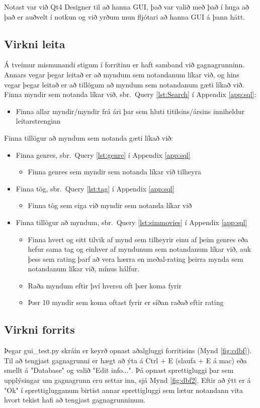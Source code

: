 \documentclass[12pt, git, draft]{rureport}
\begin{document}
Notast var við Qt4 Designer \cite{qt4} til að hanna GUI, það var valið með það í huga að það er auðvelt í notkun og við yrðum mun fljótari að hanna GUI á þann hátt.

\subsection{Virkni leita}
Á tveimur mismunandi stigum í forritinu er haft samband við gagnagrunninn. Annars vegar þegar leitað er að myndum sem notandanum líkar við, og hins vegar þegar leitað er að tillögum að myndum sem notandanum gæti líkað við.
\\
Finna myndir sem notanda líkar við, sbr.~Query \ref{lst:Search} í Appendix \ref{app:sql}:
\begin{itemize}
	\item Finna allar myndir/myndir frá ári þar sem hluti titilsins/ársins inniheldur leitarstrenginn
\end{itemize}
Finna tillögur að myndum sem notanda gæti líkað við:
\begin{itemize}
	\item Finna genres, sbr.~Query \ref{lst:genre} í Appendix \ref{app:sql}
	\begin{itemize}
		\item Finna genres sem myndir sem notanda líkar við tilheyra
	\end{itemize}
	\item Finna tög, sbr.~Query \ref{lst:tag} í Appendix \ref{app:sql}
	\begin{itemize}
		\item Finna tög sem eiga við myndir sem notanda líkar við
	\end{itemize}
	\item Finna tillögur að myndum, sbr.~Query \ref{lst:simmovies} í Appendix \ref{app:sql}
	\begin{itemize}
		\item Finna hvert og eitt tilvik af mynd sem tilheyrir einu af þeim genres eða hefur sama tag og einhver af myndunum sem notandanum líkar við, auk þess sem rating þarf að vera hærra en meðal-rating þeirra mynda sem notandanum líkar við, mínus hálfur.
		\item Raða myndum eftir því hversu oft þær koma fyrir
		\item Þær 10 myndir sem koma oftast fyrir er síðan raðað eftir rating
	\end{itemize}
\end{itemize}

\subsection{Virkni forrits}
Þegar gui\_test.py skráin er keyrð opnast aðalgluggi forritisins (Mynd \ref{fig:cdbf}). Til að tengjast gagnagrunni er hægt að ýta á Ctrl + E (slaufa + E á mac) eða smellt á "Database" og valið "Edit info...". Þá opnast sprettigluggi þar sem upplýsingar um gagnagrunn eru settar inn, sjá Mynd \ref{fig:dbf2}. Eftir að ýtt er á "Ok" í sprettiglugganum birtist annar sprettigluggi sem lætur notandann vita hvort tekist hafi að tengjast gagnagrunninum.
\end{document}
